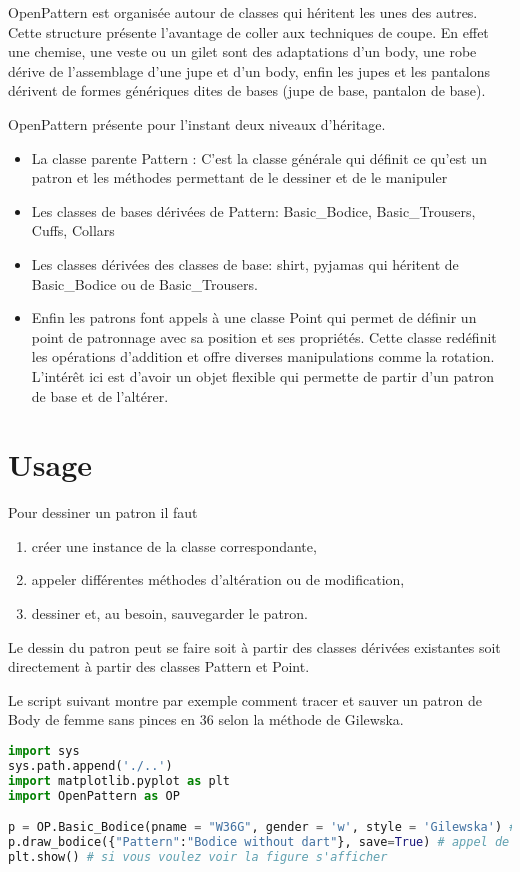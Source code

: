 \documentclass[11pt,a4paper]{report}
\begin{document}
OpenPattern est organisée autour de classes qui héritent les unes des autres. Cette structure présente l'avantage de coller aux techniques de coupe. En effet une chemise, une veste ou un gilet sont des adaptations d'un body, une robe dérive de l'assemblage d'une jupe et d'un body, enfin les jupes et les pantalons dérivent de formes génériques dites de bases (jupe de base, pantalon de base).

OpenPattern présente pour l'instant deux niveaux d'héritage.
\begin{itemize}
\item La classe parente Pattern : C'est la classe générale qui définit ce qu'est un patron et les méthodes permettant de le dessiner et de le manipuler
\item Les classes de bases dérivées de Pattern: Basic\_Bodice, Basic\_Trousers, Cuffs, Collars
\item Les classes dérivées des classes de base: shirt, pyjamas qui héritent de Basic\_Bodice ou de Basic\_Trousers. \item Enfin les patrons font appels à une classe Point qui permet de définir un point de patronnage avec sa position et ses propriétés. Cette classe redéfinit les opérations d'addition et offre diverses manipulations  comme la rotation. L'intérêt ici est d'avoir un objet flexible qui permette de partir d'un patron de base et de l'altérer.
\end{itemize}


\chapter{Usage}

Pour dessiner un patron il faut
\begin{enumerate}
\item créer une instance de la classe correspondante,
\item appeler différentes méthodes d'altération ou de modification,
\item dessiner et, au besoin, sauvegarder le patron.
\end{enumerate}

Le dessin du patron peut se faire soit à partir des classes dérivées existantes soit directement à partir des classes Pattern et Point.

Le script suivant montre par exemple comment tracer et sauver un patron de Body de femme sans pinces en 36 selon la méthode de Gilewska.
\begin{lstlisting}[language=python]
import sys
sys.path.append('./..')
import matplotlib.pyplot as plt
import OpenPattern as OP

p = OP.Basic_Bodice(pname = "W36G", gender = 'w', style = 'Gilewska') # Création de l'instance
p.draw_bodice({"Pattern":"Bodice without dart"}, save=True) # appel de la fonction de dessin
plt.show() # si vous voulez voir la figure s'afficher
\end{lstlisting}
\end{document}
